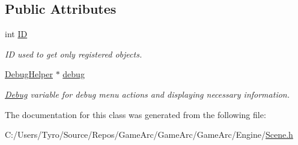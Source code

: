 \subsection*{Public Attributes}
\begin{DoxyCompactItemize}
\item 
\mbox{\label{class_scene_ac1e7daf8385257c261a212b3b34d7e28}} 
int \mbox{\hyperlink{class_scene_ac1e7daf8385257c261a212b3b34d7e28}{ID}}
\begin{DoxyCompactList}\small\item\em ID used to get only registered objects. \end{DoxyCompactList}\item 
\mbox{\label{class_scene_abb41eda003d71ee80315ab9f5da5848e}} 
\mbox{\hyperlink{class_debug_helper}{Debug\+Helper}} $\ast$ \mbox{\hyperlink{class_scene_abb41eda003d71ee80315ab9f5da5848e}{debug}}
\begin{DoxyCompactList}\small\item\em \mbox{\hyperlink{class_debug}{Debug}} variable for debug menu actions and displaying necessary information. \end{DoxyCompactList}\end{DoxyCompactItemize}


The documentation for this class was generated from the following file\+:\begin{DoxyCompactItemize}
\item 
C\+:/\+Users/\+Tyro/\+Source/\+Repos/\+Game\+Arc/\+Game\+Arc/\+Game\+Arc/\+Engine/\mbox{\hyperlink{_scene_8h}{Scene.\+h}}\end{DoxyCompactItemize}
